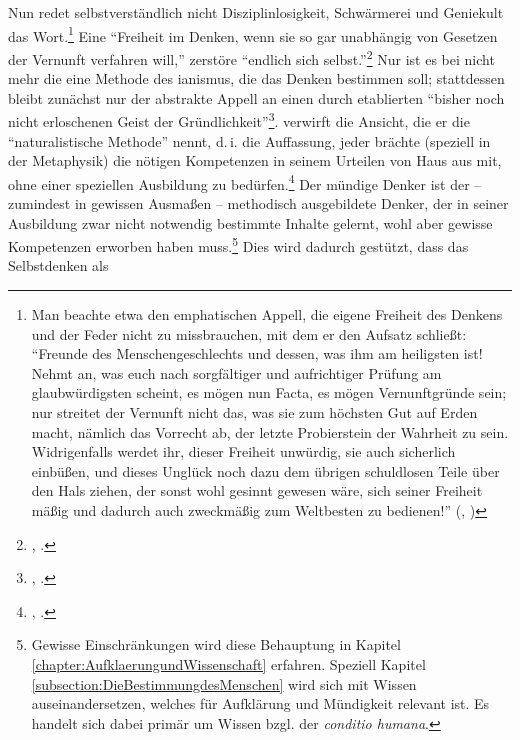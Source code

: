 Nun redet  selbstverständlich nicht Disziplinlosigkeit,
Schwärmerei und Geniekult das Wort.\footnote{Man beachte etwa den emphatischen Appell, die
eigene Freiheit des Denkens und der Feder nicht zu missbrauchen, mit dem er den
Aufsatz  schließt: \enquote{Freunde des
Menschengeschlechts und dessen, was ihm
am heiligsten ist! Nehmt an, was euch nach sorgfältiger und aufrichtiger Prüfung
am glaubwürdigsten scheint, es mögen nun Facta, es mögen Vernunftgründe sein;
nur streitet der Vernunft nicht das, was sie zum höchsten Gut auf Erden macht,
nämlich das Vorrecht ab, der letzte Probierstein der Wahrheit zu sein.
Widrigenfalls werdet ihr, dieser Freiheit unwürdig, sie auch sicherlich
einbüßen, und dieses Unglück noch dazu dem übrigen schuldlosen Teile über den
Hals ziehen, der sonst wohl gesinnt gewesen wäre, sich seiner Freiheit
mäßig und dadurch auch zweckmäßig zum Weltbesten zu bedienen!}
(\cite[][A~329\,f.]{Kant:Washeisst:SichimDenkenorientieren?1977},
\cite[][VIII: 146.23-147.4]{Kant:GesammelteWerke1900ff.})} Eine
\enquote{Freiheit im Denken, wenn sie so gar unabhängig von Gesetzen der
Vernunft verfahren will,} zerstöre \enquote{endlich sich
selbst.}\footnote{\cite[][A~328]{Kant:Washeisst:SichimDenkenorientieren?1977},
\cite[][VIII: 146.21--22]{Kant:GesammelteWerke1900ff.}.} Nur ist es bei
 nicht mehr die eine Methode des ianismus, die das Denken
bestimmen soll; stattdessen bleibt zunächst nur der abstrakte Appell an einen
durch  etablierten \enquote{bisher noch nicht
erloschenen Geist \punkt{} der
Gründlichkeit}\footnote{\cite[][B~xxxvi]{Kant:KritikderreinenVernunft2003},
\cite[III: 22.9]{Kant:GesammelteWerke1900ff.}.}.
\label{Terminus:methodischerNaturalismus}
verwirft die Ansicht, die er die \enquote{naturalistische Methode} nennt,
{d.\,i.} die Auffassung, jeder brächte (speziell in der Metaphysik) die nötigen
Kompetenzen in seinem Urteilen von Haus aus mit, ohne einer speziellen Ausbildung zu
bedürfen.\footnote{\cite[Vgl.][B~883\,f.]{Kant:KritikderreinenVernunft2003},
\cite[][III: 551.30--552.13]{Kant:GesammelteWerke1900ff.}.} Der mündige Denker
ist der -- zumindest in gewissen Ausmaßen -- methodisch ausgebildete Denker, der
in seiner Ausbildung zwar nicht notwendig bestimmte Inhalte gelernt, wohl aber
gewisse Kompetenzen erworben haben muss.\footnote{Gewisse Einschränkungen wird
diese Behauptung in Kapitel \ref{chapter:AufklaerungundWissenschaft} erfahren.
Speziell Kapitel \ref{subsection:DieBestimmungdesMenschen} wird sich mit
 Wissen auseinandersetzen, welches für Aufklärung und
Mündigkeit relevant ist. Es handelt sich dabei primär um Wissen bzgl. der
\emph{conditio humana}.} Dies wird dadurch gestützt, dass das Selbstdenken als
